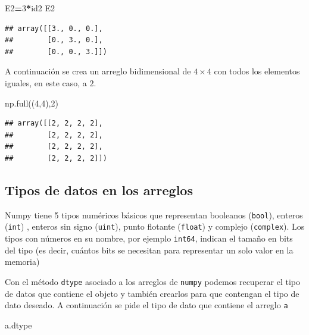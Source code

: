 \documentclass[
]{book}
\newenvironment{Shaded}{\begin{snugshade}}{\end{snugshade}}
\newcommand{\DecValTok}[1]{\textcolor[rgb]{0.00,0.00,0.81}{#1}}
\newcommand{\NormalTok}[1]{#1}
\newcommand{\OperatorTok}[1]{\textcolor[rgb]{0.81,0.36,0.00}{\textbf{#1}}}
\theoremstyle{definition}
\theoremstyle{definition}
\theoremstyle{definition}
\theoremstyle{definition}
\theoremstyle{remark}
\begin{document}
\begin{Shaded}
\begin{Highlighting}[]
\NormalTok{E2}\OperatorTok{=}\DecValTok{3}\OperatorTok{*}\NormalTok{id2}
\NormalTok{E2}
\end{Highlighting}
\end{Shaded}

\begin{verbatim}
## array([[3., 0., 0.],
##        [0., 3., 0.],
##        [0., 0., 3.]])
\end{verbatim}

A continuación se crea un arreglo bidimensional de \(4\times 4\) con todos los elementos iguales, en este caso, a \(2\).

\begin{Shaded}
\begin{Highlighting}[]
\NormalTok{np.full((}\DecValTok{4}\NormalTok{,}\DecValTok{4}\NormalTok{),}\DecValTok{2}\NormalTok{)}
\end{Highlighting}
\end{Shaded}

\begin{verbatim}
## array([[2, 2, 2, 2],
##        [2, 2, 2, 2],
##        [2, 2, 2, 2],
##        [2, 2, 2, 2]])
\end{verbatim}

\hypertarget{tipos-de-datos-en-los-arreglos}{%
\subsection{Tipos de datos en los arreglos}\label{tipos-de-datos-en-los-arreglos}}

Numpy tiene 5 tipos numéricos básicos que representan booleanos (\texttt{bool}), enteros (\texttt{int}) , enteros sin signo (\texttt{uint}), punto flotante (\texttt{float}) y complejo (\texttt{complex}). Los tipos con números en su nombre, por ejemplo \texttt{int64}, indican el tamaño en bits del tipo (es decir, cuántos bits se necesitan para representar un solo valor en la memoria)

Con el método \texttt{dtype} asociado a los arreglos de \texttt{numpy} podemos recuperar el tipo de datos que contiene el objeto y también crearlos para que contengan el tipo de dato deseado. A continuación se pide el tipo de dato que contiene el arreglo \texttt{a}

\begin{Shaded}
\begin{Highlighting}[]
\NormalTok{a.dtype }
\end{Highlighting}
\end{Shaded}
\end{document}
